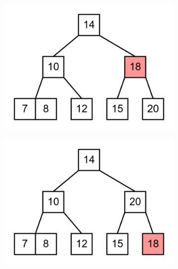 \documentclass[11pt,a4paper]{article}
\begin{document}
\begin{loesung}
\begin{enumerate}
\begin{figure}[h!]
\begin{subfigure}[b]{0.31\textwidth}
                \includegraphics[scale=0.15]{img/3e/9}
            \end{subfigure}
            \begin{subfigure}[b]{0.31\textwidth}
                \centering
                \includegraphics[scale=0.15]{img/3e/10}
            \end{subfigure}
            \begin{subfigure}[b]{0.31\textwidth}
                \centering

\end{subfigure}
\end{figure}
\end{enumerate}
\end{loesung}
\end{document}
